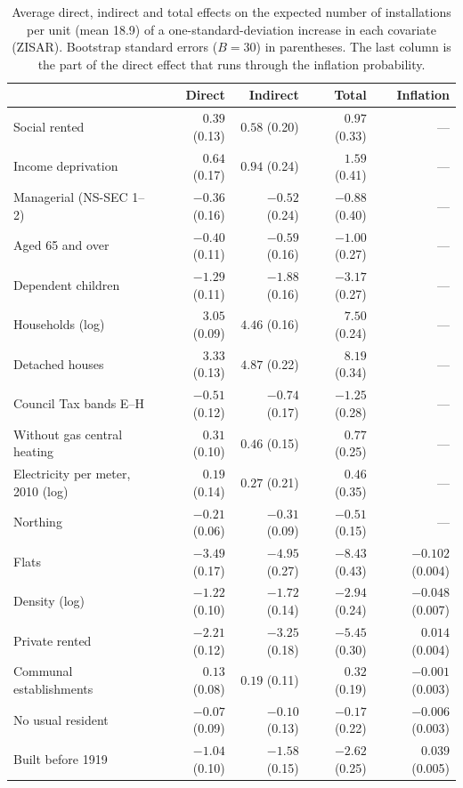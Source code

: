 \begin{table}[htbp]
\centering
\caption{Average direct, indirect and total effects on the expected number of installations per unit (mean 18.9) of a one-standard-deviation increase in each covariate (ZISAR). Bootstrap standard errors ($B = 30$) in parentheses. The last column is the part of the direct effect that runs through the inflation probability.}\label{tab:solar_effects}
\footnotesize
\begin{tabular}{lrrrr}
\toprule
 & Direct & Indirect & Total & Inflation \\
\midrule
Social rented                      & $0.39$ (0.13) & $0.58$ (0.20) & $0.97$ (0.33) & --- \\
Income deprivation                 & $0.64$ (0.17) & $0.94$ (0.24) & $1.59$ (0.41) & --- \\
Managerial (NS-SEC 1--2)           & $-0.36$ (0.16) & $-0.52$ (0.24) & $-0.88$ (0.40) & --- \\
Aged 65 and over                   & $-0.40$ (0.11) & $-0.59$ (0.16) & $-1.00$ (0.27) & --- \\
Dependent children                 & $-1.29$ (0.11) & $-1.88$ (0.16) & $-3.17$ (0.27) & --- \\
Households (log)                   & $3.05$ (0.09) & $4.46$ (0.16) & $7.50$ (0.24) & --- \\
Detached houses                    & $3.33$ (0.13) & $4.87$ (0.22) & $8.19$ (0.34) & --- \\
Council Tax bands E--H             & $-0.51$ (0.12) & $-0.74$ (0.17) & $-1.25$ (0.28) & --- \\
Without gas central heating        & $0.31$ (0.10) & $0.46$ (0.15) & $0.77$ (0.25) & --- \\
Electricity per meter, 2010 (log)  & $0.19$ (0.14) & $0.27$ (0.21) & $0.46$ (0.35) & --- \\
Northing                           & $-0.21$ (0.06) & $-0.31$ (0.09) & $-0.51$ (0.15) & --- \\
\midrule
Flats                              & $-3.49$ (0.17) & $-4.95$ (0.27) & $-8.43$ (0.43) & $-0.102$ (0.004) \\
Density (log)                      & $-1.22$ (0.10) & $-1.72$ (0.14) & $-2.94$ (0.24) & $-0.048$ (0.007) \\
Private rented                     & $-2.21$ (0.12) & $-3.25$ (0.18) & $-5.45$ (0.30) & $0.014$ (0.004) \\
Communal establishments            & $0.13$ (0.08) & $0.19$ (0.11) & $0.32$ (0.19) & $-0.001$ (0.003) \\
No usual resident                  & $-0.07$ (0.09) & $-0.10$ (0.13) & $-0.17$ (0.22) & $-0.006$ (0.003) \\
Built before 1919                  & $-1.04$ (0.10) & $-1.58$ (0.15) & $-2.62$ (0.25) & $0.039$ (0.005) \\
\bottomrule
\end{tabular}
\end{table}

